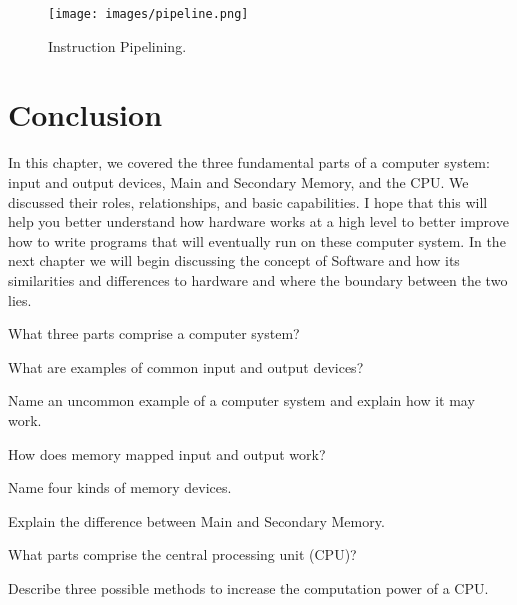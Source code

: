 \begin{figure}
	\centering
	\texttt{[image: images/pipeline.png]}
	\caption{Instruction Pipelining. }
	\label{fig:hardware:pipeline}
\end{figure}


\section {Conclusion}
In this chapter, we covered the three fundamental parts of a computer system:
input and output devices, Main and Secondary Memory, and the CPU. We discussed
their roles, relationships, and basic capabilities. I hope that this will help
you better understand how hardware works at a high level to better improve how
to write programs that will eventually run on these computer system. In the
next chapter we will begin discussing the concept of Software and how its
similarities and differences to hardware and where the boundary between the two
lies.

\exercisesection

\begin{exercise}
What three parts comprise a computer system?
\end{exercise}

\begin{exercise}
What are examples of common input and output devices?
\end{exercise}

\begin{exercise}
Name an uncommon example of a computer system and explain how it may work.
\end{exercise}

\begin{exercise}
How does memory mapped input and output work?
\end{exercise}

\begin{exercise}
Name four kinds of memory devices.
\end{exercise}

\begin{exercise}
Explain the difference between Main and Secondary Memory.
\end{exercise}

\begin{exercise}
What parts comprise the central processing unit (CPU)?
\end{exercise}

\begin{exercise}
Describe three possible methods to increase the computation power of a CPU.
\end{exercise}
